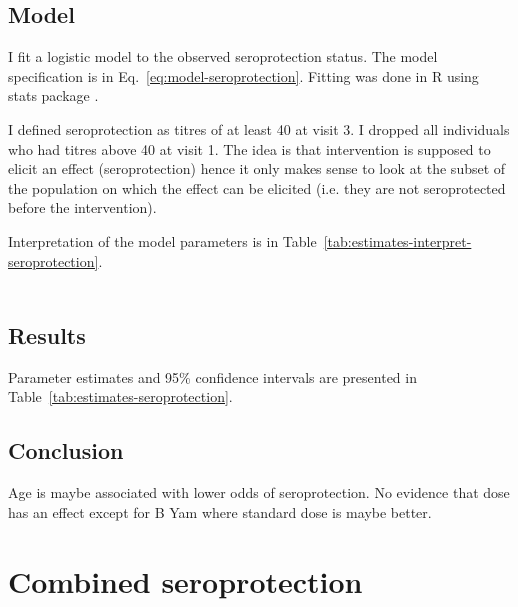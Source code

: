 \documentclass[11pt]{article}
\begin{document}
\subsection{Model}

I fit a logistic model to the observed seroprotection status.
The model specification is in Eq.~\ref{eq:model-seroprotection}.
Fitting was done in R using stats package \cite{R}.

I defined seroprotection as titres of at least 40 at visit 3.
I dropped all individuals who had titres above 40 at visit 1.
The idea is that intervention is supposed to elicit an effect (seroprotection)
hence it only makes sense to look at the subset of the population on which
the effect can be elicited
(i.e. they are not seroprotected before the intervention).

Interpretation of the model parameters is in
Table~\ref{tab:estimates-interpret-seroprotection}.

\begin{equation}
    \begin{gathered}
        \label{eq:model-seroprotection}
        
    \end{gathered}
\end{equation}





\subsection{Results}

Parameter estimates and 95\% confidence intervals
are presented in Table~\ref{tab:estimates-seroprotection}.



\subsection{Conclusion}

Age is maybe associated with lower odds of seroprotection. No evidence that
dose has an effect except for B Yam where standard dose is maybe better.

\section{Combined seroprotection}
\end{document}
